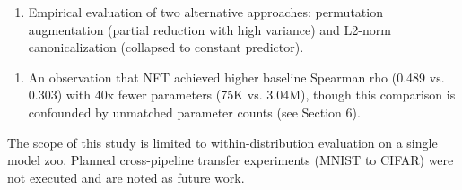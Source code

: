 \begin{enumerate}
\item Empirical evaluation of two alternative approaches: permutation augmentation (partial reduction with high variance) and L2-norm canonicalization (collapsed to constant predictor).
\end{enumerate}

\begin{enumerate}
\item An observation that NFT achieved higher baseline Spearman rho (0.489 vs. 0.303) with 40x fewer parameters (75K vs. 3.04M), though this comparison is confounded by unmatched parameter counts (see Section 6).
\end{enumerate}

The scope of this study is limited to within-distribution evaluation on a single model zoo. Planned cross-pipeline transfer experiments (MNIST to CIFAR) were not executed and are noted as future work.
